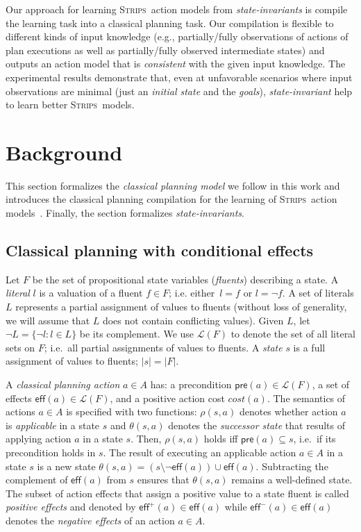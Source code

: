 \documentclass{article}
\newcommand{\pre}{\mathsf{pre}}     %
\newcommand{\eff}{\mathsf{eff}}     %
\newcommand{\strips}{\textsc{Strips}}
\begin{document}
Our approach for learning \strips\ action models from {\em state-invariants} is compile the learning task into a classical planning task. Our compilation is flexible to different kinds of input knowledge (e.g., partially/fully observations of actions of plan executions as well as partially/fully observed intermediate states) and outputs an action model that is {\em consistent} with the given input knowledge. The experimental results demonstrate that, even at unfavorable scenarios where input observations are minimal (just an {\em initial state} and the {\em goals}), {\em state-invariant} help to learn better \strips\ models. 



\section{Background}
\label{sec:background}
This section formalizes the {\em classical planning model} we follow in this work and introduces the classical planning compilation for the learning of \strips\ action models~\cite{aineto2018learning}. Finally, the section formalizes {\em state-invariants}.

\subsection{Classical planning with conditional effects}
Let $F$ be the set of  propositional state variables ({\em fluents}) describing a state. A {\em literal} $l$ is a valuation of a fluent $f\in F$; i.e. either~$l=f$ or $l=\neg f$. A set of literals $L$ represents a partial assignment of values to fluents (without loss of generality, we will assume that $L$ does not contain conflicting values). Given $L$, let $\neg L=\{\neg l:l\in L\}$ be its complement. We use $\mathcal{L}(F)$ to denote the set of all literal sets on $F$; i.e.~all partial assignments of values to fluents. A {\em state} $s$ is a full assignment of values to fluents; $|s|=|F|$.

A {\em classical planning action} $a\in A$ has: a precondition $\pre(a)\in\mathcal{L}(F)$, a set of effects $\eff(a)\in\mathcal{L}(F)$, and a positive action cost $cost(a)$. The semantics of actions $a\in A$ is specified with two functions: $\rho(s,a)$ denotes whether action $a$ is {\em applicable} in a state $s$ and $\theta(s,a)$ denotes the {\em successor state} that results of applying action $a$ in a state $s$. Then, $\rho(s,a)$ holds iff $\pre(a)\subseteq s$, i.e.~if its precondition holds in $s$. The result of executing an applicable action $a\in A$ in a state $s$ is a new state $\theta(s,a)=(s\setminus \neg\eff(a))\cup\eff(a)$. Subtracting the complement of $\eff(a)$ from $s$ ensures that $\theta(s,a)$ remains a well-defined state. The subset of action effects that assign a positive value to a state fluent is called {\em positive effects} and denoted by $\eff^+(a)\in \eff(a)$ while $\eff^-(a)\in \eff(a)$ denotes the {\em negative effects} of an action $a\in A$.
\end{document}
